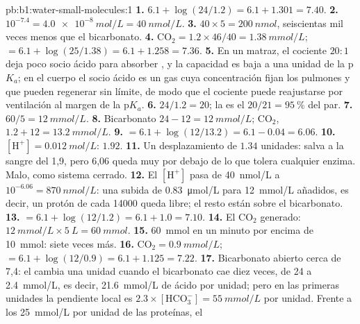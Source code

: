 \begin{solution}{pb:b1:water-small-molecules:1}
\textbf{1.} $6.1 + \log(24/1.2) = 6.1 + 1.301 = 7.40$.
\textbf{2.} $10^{-7.4} = \qty{4.0e-8}{mol/L} = \qty{40}{nmol/L}$.
\textbf{3.} $40\times 5 = \qty{200}{nmol}$, seiscientas mil veces menos que
el bicarbonato.
\textbf{4.} $\mathrm{CO_2} = 1.2\times 46/40 = \qty{1.38}{mmol/L}$;
 $= 6.1 + \log(25/1.38) = 6.1 + 1.258 = 7.36$.
\textbf{5.} En un matraz, el cociente $20:1$ deja poco socio ácido para
absorber , y la capacidad es baja a una unidad de la p$K_a$; en el
cuerpo el socio ácido es un gas cuya concentración fijan los pulmones y que
pueden regenerar sin límite, de modo que el cociente puede reajustarse por
ventilación al margen de la p$K_a$.
\textbf{6.} $24/1.2 = 20$; la  es el $20/21 = \qty{95}{\%}$ del par.
\textbf{7.} $60/5 = \qty{12}{mmol/L}$.
\textbf{8.} Bicarbonato $24 - 12 = \qty{12}{mmol/L}$; $\mathrm{CO_2}$,
$1.2 + 12 = \qty{13.2}{mmol/L}$.
\textbf{9.}  $= 6.1 + \log(12/13.2) = 6.1 - 0.04 = 6.06$.
\textbf{10.} $[\mathrm{H^+}] = \qty{0.012}{mol/L}$:  $1.92$.
\textbf{11.} Un desplazamiento de $1.34$ unidades: salva a la sangre del 
1,9, pero 6,06 queda muy por debajo de lo que tolera cualquier enzima. Malo,
como sistema cerrado.
\textbf{12.} El $[\mathrm{H^+}]$ pasa de \qty{40}{nmol/L} a $10^{-6.06} = \qty{870}{nmol/L}$: una subida de \qty{0.83}{\micro mol/L} para \qty{12}{mmol/L} añadidos, es decir, un protón de cada \num{14000} queda libre; el resto están sobre el bicarbonato.
\textbf{13.}  $= 6.1 + \log(12/1.2) = 6.1 + 1.0 = 7.10$.
\textbf{14.} El $\mathrm{CO_2}$ generado: $\qty{12}{mmol/L}\times
\qty{5}{L} = \qty{60}{mmol}$.
\textbf{15.} \qty{60}{mmol} en un minuto por encima de \qty{10}{mmol}:
siete veces más.
\textbf{16.} $\mathrm{CO_2} = \qty{0.9}{mmol/L}$;  $= 6.1 +
\log(12/0.9) = 6.1 + 1.125 = 7.22$.
\textbf{17.} Bicarbonato abierto cerca de 7,4: el  cambia una unidad
cuando el bicarbonato cae diez veces, de \qty{24}{} a \qty{2.4}{mmol/L}, es
decir, \qty{21.6}{mmol/L} de ácido por unidad; pero en las primeras unidades
la pendiente local es $2.3\times[\mathrm{HCO_3^-}] =
\qty{55}{mmol/L}$ por
unidad. Frente a los \qty{25}{mmol/L} por unidad de las proteínas, el

\end{solution}
